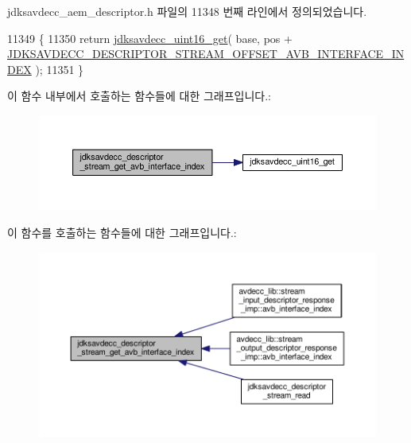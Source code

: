 jdksavdecc\+\_\+aem\+\_\+descriptor.\+h 파일의 11348 번째 라인에서 정의되었습니다.


\begin{DoxyCode}
11349 \{
11350     \textcolor{keywordflow}{return} \hyperlink{group__endian_ga3fbbbc20be954aa61e039872965b0dc9}{jdksavdecc\_uint16\_get}( base, pos + 
      \hyperlink{group__descriptor__stream_ga63cbd5e74dc3dd343d7d318527d6d2e1}{JDKSAVDECC\_DESCRIPTOR\_STREAM\_OFFSET\_AVB\_INTERFACE\_INDEX}
       );
11351 \}
\end{DoxyCode}


이 함수 내부에서 호출하는 함수들에 대한 그래프입니다.\+:
\nopagebreak
\begin{figure}[H]
\begin{center}
\leavevmode
\includegraphics[width=350pt]{group__descriptor__stream_ga8d7737072e637ae7ba6c607e9907893a_cgraph}
\end{center}
\end{figure}




이 함수를 호출하는 함수들에 대한 그래프입니다.\+:
\nopagebreak
\begin{figure}[H]
\begin{center}
\leavevmode
\includegraphics[width=350pt]{group__descriptor__stream_ga8d7737072e637ae7ba6c607e9907893a_icgraph}
\end{center}
\end{figure}


